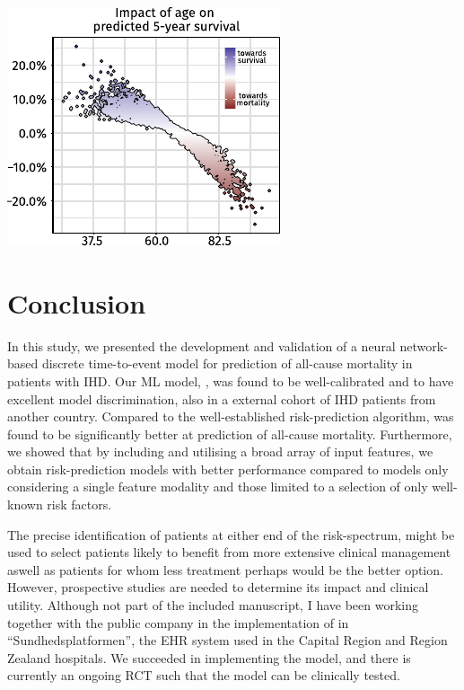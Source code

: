 \begin{marginfigure}
    \includegraphics{graphics/pmhnet-v1-shap-age.pdf}
    \caption[\acs{SHAP}-dependence plot for patient age]{%
        Example of a \acs{SHAP} dependence plot 
        showing the \ac{SHAP} value of each \enquote{age} feature
        across the entire test set.}
    \label{fig:shap-dependence-age}
\end{marginfigure}%

\section{Conclusion}

In this study, we presented the development and validation of a 
neural network-based discrete time-to-event model for prediction of 
all-cause mortality in patients with \ac{IHD}. 
Our \ac{ML} model, , was found to be well-calibrated and 
to have excellent model discrimination, also in a external cohort 
of \ac{IHD} patients from another country.
Compared to the well-established \graceii{} risk-prediction algorithm,
 was found to be significantly better at prediction of all-cause 
mortality.
Furthermore, we showed that by including and utilising a broad array 
of input features, we obtain risk-prediction models with better performance
compared to models only considering a single feature modality and
those limited to a selection of only well-known risk factors.

The precise identification of patients at either end of the risk-spectrum,
might be used to select 
patients likely to benefit from more extensive clinical management 
aswell as patients for whom less treatment perhaps 
would be the better option.
However, prospective studies are needed to determine its  impact and
clinical utility.  
Although not part of the included manuscript, 
I have been working together with the public company 
in the implementation of  in \enquote{Sundhedsplatformen}, 
the \ac{EHR} system used in the Capital Region and Region Zealand hospitals.
We succeeded in implementing the model, and there is currently 
an ongoing \ac{RCT} such that the model can be clinically tested.
~\autocite{bundgaardClinical2023}

